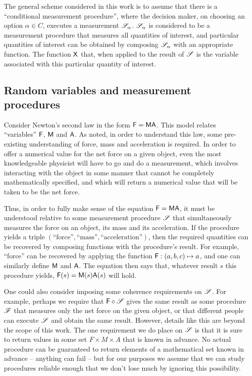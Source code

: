 The general scheme considered in this work is to assume that there is a  ``conditional measurement procedure'', where the decision maker, on choosing an option $\alpha\in C$, executes a measurement $\mathscr{S}_\alpha$. $\mathscr{S}_\alpha$ is considered to be a measurement procedure that measures all quantities of interest, and particular quantities of interest can be obtained by composing $\mathscr{S}_\alpha$ with an appropriate function. The function $\mathsf{X}$ that, when applied to the result of $\mathscr{S}$ is the variable associated with this particular quantity of interest.

\subsection{Random variables and measurement procedures}\label{sec:rvs_mps}

Consider Newton's second law in the form $\mathsf{F}=\mathsf{MA}$. This model relates ``variables'' $\mathsf{F}$, $\mathsf{M}$ and $\mathsf{A}$. As \citet{feynman_feynman_1979} noted, in order to understand this law, some pre-existing understanding of force, mass and acceleration is required. In order to offer a numerical value for the net force on a given object, even the most knowledgeable physicist will have to go and do a measurement, which involves interacting with the object in some manner that cannot be completely mathematically specified, and which will return a numerical value that will be taken to be the net force.

Thus, in order to fully make sense of the equation $\mathsf{F}=\mathsf{MA}$, it must be understood relative to some measurement procedure $\mathscr{S}$ that simultaneously measures the force on an object, its mass and its acceleration. If the procedure yields a triple $(\text{``force''},\text{``mass''},\text{``acceleration''})$, then the required quantities can be recovered by composing functions with the procedure's result. For example, ``force'' can be recovered by applying the function $\mathsf{F}:(a,b,c)\mapsto a$, and one can similarly define $\mathsf{M}$ and $\mathsf{A}$. The equation then says that, whatever result $s$ this procedure yields, $\mathsf{F}(s)=\mathsf{M}(s)\mathsf{A}(s)$ will hold.

One could also consider imposing some coherence requirements on $\mathscr{S}$. For example, perhaps we require that $\mathsf{F}\circ\mathscr{S}$ gives the same result as some procedure $\mathscr{F}$ that measures only the net force on the given object, or that different people can execute $\mathscr{S}$ and obtain the same result. However, details like this are beyond the scope of this work. The one requirement we do place on $\mathscr{S}$ is that it is sure to return values in some set $F\times M\times A$ that is known in advance. No actual procedure can be guaranteed to return elements of a mathematical set known in advance -- anything can fail -- but for our purposes we assume that we can study procedures reliable enough that we don't lose much by ignoring this possibility.

